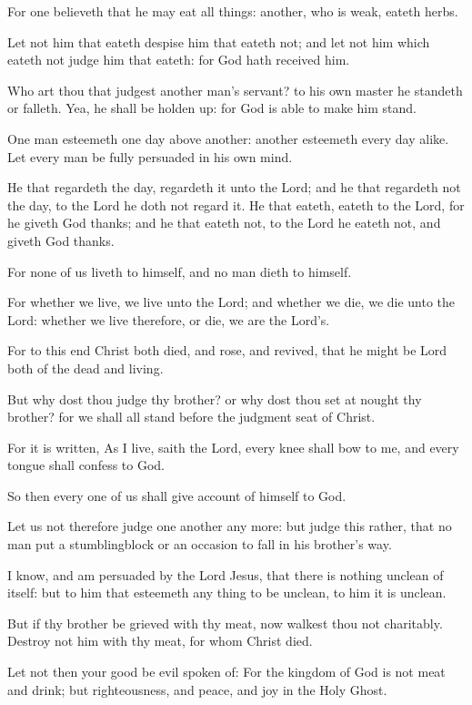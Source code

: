 \verse For one believeth that he may eat all things: another, who is weak, eateth herbs.

\verse Let not him that eateth despise him that eateth not; and let not him which eateth not judge him that eateth: for God hath received him.

\verse Who art thou that judgest another man's servant? to his own master he standeth or falleth. Yea, he shall be holden up: for God is able to make him stand.

\verse One man esteemeth one day above another: another esteemeth every day alike. Let every man be fully persuaded in his own mind.

\verse He that regardeth the day, regardeth it unto the Lord; and he that regardeth not the day, to the Lord he doth not regard it. He that eateth, eateth to the Lord, for he giveth God thanks; and he that eateth not, to the Lord he eateth not, and giveth God thanks.

\verse For none of us liveth to himself, and no man dieth to himself.

\verse For whether we live, we live unto the Lord; and whether we die, we die unto the Lord: whether we live therefore, or die, we are the Lord's.

\verse For to this end Christ both died, and rose, and revived, that he might be Lord both of the dead and living.

\verse But why dost thou judge thy brother? or why dost thou set at nought thy brother? for we shall all stand before the judgment seat of Christ.

\verse For it is written, As I live, saith the Lord, every knee shall bow to me, and every tongue shall confess to God.

\verse So then every one of us shall give account of himself to God.

\verse Let us not therefore judge one another any more: but judge this rather, that no man put a stumblingblock or an occasion to fall in his brother's way.

\verse I know, and am persuaded by the Lord Jesus, that there is nothing unclean of itself: but to him that esteemeth any thing to be unclean, to him it is unclean.

\verse But if thy brother be grieved with thy meat, now walkest thou not charitably. Destroy not him with thy meat, for whom Christ died.

\verse Let not then your good be evil spoken of: \verse For the kingdom of God is not meat and drink; but righteousness, and peace, and joy in the Holy Ghost.

